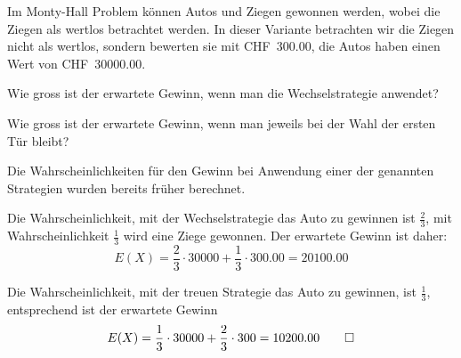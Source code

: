 Im Monty-Hall Problem können Autos und Ziegen gewonnen werden, wobei
die Ziegen als wertlos betrachtet werden. In dieser Variante betrachten
wir die Ziegen nicht als wertlos, sondern bewerten sie mit CHF~300.00,
die Autos haben einen Wert von CHF~30000.00.
\begin{teilaufgaben}
\item Wie gross ist der erwartete Gewinn, wenn man die Wechselstrategie
anwendet?
\item Wie gross ist der erwartete Gewinn, wenn man jeweils bei der Wahl
der ersten Tür bleibt?
\end{teilaufgaben}

\begin{loesung}
Die Wahrscheinlichkeiten für den Gewinn bei Anwendung einer der
genannten Strategien wurden bereits früher berechnet.
\begin{teilaufgaben}
\item
Die Wahrscheinlichkeit, mit der Wechselstrategie das Auto zu gewinnen
ist $\frac23$, mit Wahrscheinlichkeit $\frac13$ wird eine Ziege gewonnen.
Der erwartete Gewinn ist daher:
\[
E(X)=\frac23\cdot 30000+\frac13\cdot 300.00=20100.00
\]
\item
Die Wahrscheinlichkeit, mit der treuen Strategie das Auto zu
gewinnen, ist $\frac13$, entsprechend ist der erwartete Gewinn
\[
E(X)=\frac13\cdot 30000+\frac23\cdot 300=10200.00
\qedhere
\]
\end{teilaufgaben}
\end{loesung}


